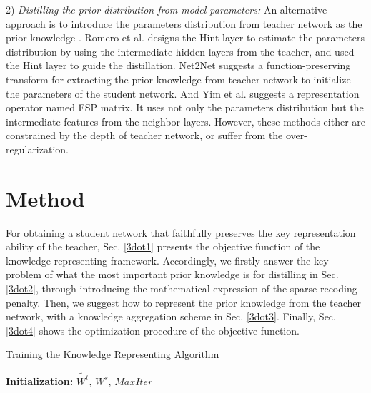 \documentclass[10pt,twocolumn,letterpaper]{article}
\begin{document}
2) \emph{Distilling the prior distribution from model parameters:}
An alternative approach is to
introduce the parameters distribution from teacher network
as the prior knowledge \cite{Romero2014FitNets, yim2017gift, Zagoruyko2017Paying}.
Romero et al. \cite{Romero2014FitNets} designs the Hint layer to
estimate the parameters distribution
by using the intermediate hidden layers from the teacher,
and used the Hint layer to guide the distillation.
Net2Net \cite{Chen2015Net2Net} suggests a function-preserving transform
for extracting the prior knowledge from teacher network
to initialize the parameters of the student network.
And Yim et al. \cite{yim2017gift} suggests
a representation operator named FSP matrix.
It uses not only the parameters distribution
but the intermediate features from the neighbor layers.
However,
these methods either are constrained by the depth of teacher network,
or suffer from the over-regularization.





\section{Method}
For obtaining a student network that
faithfully preserves the key representation ability of the teacher,
Sec. \ref{3dot1} presents the objective function
of the knowledge representing framework.
Accordingly,
we firstly answer the key problem of
what the most important prior knowledge is for distilling in Sec. \ref{3dot2},
through introducing the mathematical expression of the sparse recoding penalty.
Then,
we suggest how to represent the prior knowledge from the teacher network,
with a knowledge aggregation scheme in Sec. \ref{3dot3}.
Finally, Sec. \ref{3dot4} shows the optimization procedure
of the objective function.

\begin{algorithm}[b]
    \caption{Training the Knowledge Representing Algorithm}
    \textbf{Initialization:} $\tilde{W^t}$, $W^s$, $MaxIter$\;
\label{alg:frame}
\end{algorithm}
\end{document}
